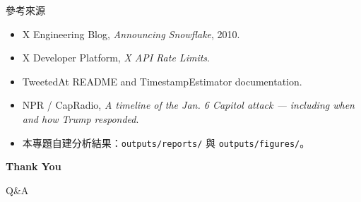 \documentclass[aspectratio=169]{ctexbeamer}
\begin{document}
\begin{frame}{參考來源}
\footnotesize
\begin{itemize}
  \item X Engineering Blog, \emph{Announcing Snowflake}, 2010.
  \item X Developer Platform, \emph{X API Rate Limits}.
  \item TweetedAt README and TimestampEstimator documentation.
  \item NPR / CapRadio, \emph{A timeline of the Jan. 6 Capitol attack — including when and how Trump responded}.
  \item 本專題自建分析結果：\texttt{outputs/reports/} 與 \texttt{outputs/figures/}。
\end{itemize}
\end{frame}

\begin{frame}[plain]
\centering
\vspace{2.2cm}
{\color{TextLight}\bfseries\fontsize{28}{34}\selectfont Thank You\par}
\vspace{0.5cm}
{\color{GradientEnd}\Large Q\&A\par}
\end{frame}
\end{document}
